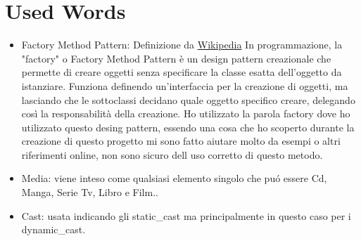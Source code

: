 \documentclass[a4paper,12pt]{article}
\begin{document}
\section{Used Words}
\begin{itemize}
    \item Factory Method Pattern: Definizione da \href{https://it.wikipedia.org/wiki/Factory_method}{Wikipedia}  In programmazione, la "factory" o Factory Method Pattern è un design pattern creazionale che permette di creare oggetti senza specificare la classe esatta dell'oggetto da istanziare. Funziona definendo un'interfaccia per la creazione di oggetti, ma lasciando che le sottoclassi decidano quale oggetto specifico creare, delegando così la responsabilità della creazione. Ho utilizzato la parola factory dove ho utilizzato questo desing pattern, essendo una cosa che ho scoperto durante la creazione di questo progetto mi sono fatto aiutare molto da esempi o altri riferimenti online, non sono sicuro dell uso corretto di questo metodo.
    \item Media: viene inteso come qualsiasi elemento singolo che puó essere Cd, Manga, Serie Tv, Libro e Film..
    \item Cast: usata indicando gli static\_cast ma principalmente in questo caso per i dynamic\_cast.
\end{itemize}
\end{document}
